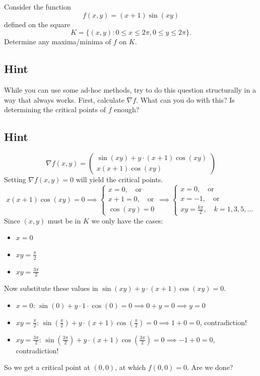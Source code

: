 \documentclass[a4paper,10pt]{article}
\begin{document}
Consider the function
\[
    f(x,y) = (x+1)\sin(xy)
\]
defined on the square
\[
    K = \{(x,y): 0 \leq x \leq 2\pi, 0 \leq y \leq 2\pi\}.
\]
Determine any maxima/minima of $f$ on $K$.

\subsection{Hint}
While you can use some ad-hoc methods, try to do this question structurally in a way that always works. First, calculate $\nabla f$. What can you do with this? Is determining the critical points of $f$ enough?

\subsection{Hint}
\[
    \nabla f(x,y) = \begin{pmatrix}
        \sin(xy) + y\cdot(x+1)\cos(xy) \\ x(x+1)\cos(xy)
    \end{pmatrix}
\]
Setting $\nabla f(x,y) = 0$ will yield the critical points.
\[
    x(x+1)\cos(xy) = 0 \implies \begin{cases}
        x = 0, \quad \mathrm{or}      \\
        x + 1  = 0, \quad \mathrm{or} \\
        \cos(xy) = 0
    \end{cases} \implies \begin{cases}
        x = 0, \quad \mathrm{or}  \\
        x = -1, \quad \mathrm{or} \\
        xy = \frac{k\pi}{2}, \quad k = 1,3,5,\ldots
    \end{cases}
\]
Since $(x,y)$ must be in $K$ we only have the cases:
\begin{itemize}
    \item $x=0$
    \item $xy = \frac{\pi}{2}$
    \item $xy = \frac{3\pi}{2}$
\end{itemize}
Now substitute these values in $\sin(xy) + y\cdot(x+1)\cos(xy) = 0$.
\begin{itemize}
    \item $x=0$: $\sin(0) + y\cdot 1\cdot \cos(0) = 0 \implies 0 + y = 0 \implies y = 0$
    \item $xy = \frac{\pi}{2}$: $\sin(\frac{\pi}{2}) + y\cdot(x+1)\cos(\frac{\pi}{2}) = 0 \implies 1 + 0 = 0$, contradiction!
    \item $xy = \frac{3\pi}{2}$: $\sin(\frac{3\pi}{2}) + y\cdot(x+1)\cos(\frac{3\pi}{2}) = 0 \implies -1 + 0 = 0$, contradiction!
\end{itemize}
So we get a critical point at $(0, 0)$, at which $f(0,0) = 0$. Are we done?
\end{document}
